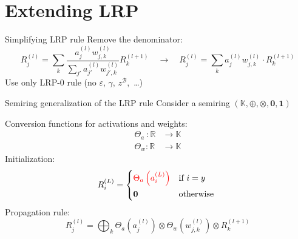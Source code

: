 \documentclass[aspectratio=169]{beamer}
\theoremstyle{definition}
\begin{document}
\section{Extending LRP}
\begin{frame}{Simplifying LRP rule}
    Remove the denominator:
    \begin{equation*}
        R^{(l)}_j = \sum_k\frac{a^{(l)}_jw_{j, k}^{(l)}}{\sum_{j'}a^{(l)}_{j'}w_{j', k}^{(l)}} R^{(l+1)}_k \quad \longrightarrow \quad R^{(l)}_j = \sum_{k} a^{(l)}_jw_{j, k}^{(l)} \cdot R^{(l+1)}_k
    \end{equation*}
    \newline{}
    Use only LRP-0 rule (no $\varepsilon$, $\gamma$, $z^\mathcal{B}$, \dots)
\end{frame}

\begin{frame}{Semiring generalization of the LRP rule}
    Consider a semiring $(\mathbb{K}, \oplus, \otimes, \mathbf{0}, \mathbf{1})$

    Conversion functions for activations and weights:
    \begin{equation*}
        \begin{aligned}
            \Theta_a\: : \mathbb{R} \!\!&\longrightarrow \mathbb{K}\\
            \Theta_w : \mathbb{R} &\longrightarrow \mathbb{K}
        \end{aligned}
    \end{equation*}
    Initialization:
    \begin{equation}
        R^{(L)}_i = \begin{cases*}
            \textcolor{red}{\Theta_a\left(a^{(L)}_i\right)} & if $i = y$\\
            \mathbf{0} & otherwise
        \end{cases*}
    \end{equation}
    Propagation rule:
    \begin{equation}
        R^{(l)}_j = \bigoplus_k \Theta_a\left(a^{(l)}_j\right) \otimes \Theta_w\left(w_{j, k}^{(l)}\right) \otimes R^{(l+1)}_k
    \end{equation}
\end{frame}
\end{document}

